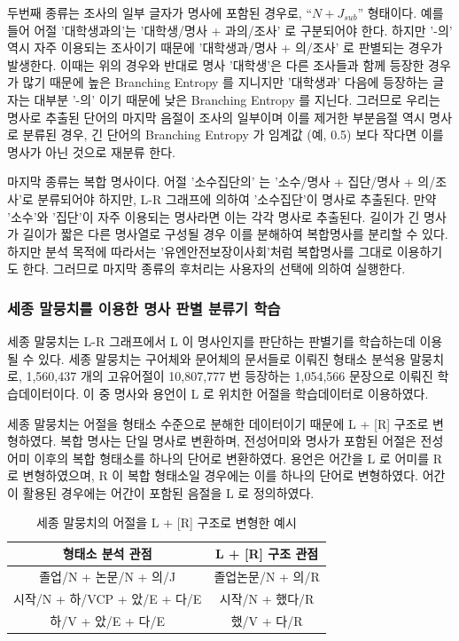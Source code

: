 \documentclass[11pt]{article}
\begin{document}
두번째 종류는 조사의 일부 글자가 명사에 포함된 경우로, “$N + J_{sub}$” 형태이다.
예를 들어 어절 '대학생과의'는 '대학생/명사 + 과의/조사' 로 구분되어야 한다.
하지만 '-의' 역시 자주 이용되는 조사이기 때문에 '대학생과/명사 + 의/조사' 로 판별되는 경우가 발생한다.
이때는 위의 경우와 반대로 명사 '대학생'은 다른 조사들과 함께 등장한 경우가 많기 때문에 높은 Branching Entropy 를 지니지만 '대학생과' 다음에 등장하는 글자는 대부분 '-의' 이기 때문에 낮은 Branching Entropy 를 지닌다.
그러므로 우리는 명사로 추출된 단어의 마지막 음절이 조사의 일부이며 이를 제거한 부분음절 역시 명사로 분류된 경우, 긴 단어의 Branching Entropy 가 임계값 (예, 0.5) 보다 작다면 이를 명사가 아닌 것으로 재분류 한다.

마지막 종류는 복합 명사이다.
어절 '소수집단의' 는 '소수/명사 + 집단/명사 + 의/조사'로 분류되어야 하지만, L-R 그래프에 의하여 '소수집단'이 명사로 추출된다.
만약 '소수'와 '집단'이 자주 이용되는 명사라면 이는 각각 명사로 추출된다.
길이가 긴 명사가 길이가 짧은 다른 명사열로 구성될 경우 이를 분해하여 복합명사를 분리할 수 있다.
하지만 분석 목적에 따라서는 '유엔안전보장이사회'처럼 복합명사를 그대로 이용하기도 한다.
그러므로 마지막 종류의 후처리는 사용자의 선택에 의하여 실행한다.

\subsubsection{세종 말뭉치를 이용한 명사 판별 분류기 학습}

세종 말뭉치는 L-R 그래프에서 L 이 명사인지를 판단하는 판별기를 학습하는데 이용될 수 있다.
세종 말뭉치는 구어체와 문어체의 문서들로 이뤄진 형태소 분석용 말뭉치로, 1,560,437 개의 고유어절이 10,807,777 번 등장하는 1,054,566 문장으로 이뤄진 학습데이터이다.
이 중 명사와 용언이 L 로 위치한 어절을 학습데이터로 이용하였다.

세종 말뭉치는 어절을 형태소 수준으로 분해한 데이터이기 때문에 L + [R] 구조로 변형하였다.
복합 명사는 단일 명사로 변환하며, 전성어미와 명사가 포함된 어절은 전성어미 이후의 복합 형태소를 하나의 단어로 변환하였다.
용언은 어간을 L 로 어미를 R 로 변형하였으며, R 이 복합 형태소일 경우에는 이를 하나의 단어로 변형하였다.
어간이 활용된 경우에는 어간이 포함된 음절을 L 로 정의하였다.

\begin{table}[ht]
\centering
\caption{세종 말뭉치의 어절을 L + [R] 구조로 변형한 예시}
\label{tab:lrstructure}
\begin{tabular}{|c|c|}
\hline
\rowcolor[HTML]{EFEFEF} 
\textbf{형태소 분석 관점} & \textbf{L + [R] 구조 관점} \\ \hline
졸업/N + 논문/N + 의/J & 졸업논문/N + 의/R \\ \hline
시작/N + 하/VCP + 았/E + 다/E & 시작/N + 했다/R \\ \hline
하/V + 았/E + 다/E & 했/V + 다/R \\ \hline
\end{tabular}%
\end{table}
\end{document}
